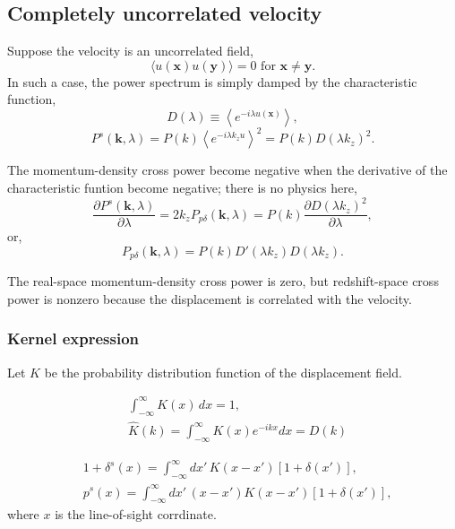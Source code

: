\documentclass[a4paper,11pt, fleqn]{article}
\begin{document}
\subsection{Completely uncorrelated velocity}

Suppose the velocity is an uncorrelated field,
\begin{equation}
  \langle u(\bm{x}) u(\bm{y}) \rangle = 0 \mbox{ for $\bm{x} \neq \bm{y}$}.
\end{equation}
In such a case, the power spectrum is simply damped by the
characteristic function,
%
\begin{equation}
  D(\lambda) \equiv \left\langle e^{-i\lambda u(\bm{x})}\right\rangle,
\end{equation}
%
\begin{equation}
  P^s(\bm{k}, \lambda) = P(k) \left\langle e^{-i\lambda k_z u} \right\rangle^2
  = P(k) D(\lambda k_z)^2.
\end{equation}

The momentum-density cross power become negative when the derivative
of the characteristic funtion become negative; there is no physics
here,
\begin{equation}
  \frac{\partial P^s(\bm{k}, \lambda)}{\partial \lambda}
  = 2k_z P_{p\delta}(\bm{k}, \lambda)
  = P(k) \frac{\partial D(\lambda k_z)^2}{\partial \lambda},
\end{equation}
or,
\begin{equation}
  P_{p\delta}(\bm{k}, \lambda) = P(k) D'(\lambda k_z) D(\lambda k_z).
\end{equation}

The real-space momentum-density cross power is zero, but
redshift-space cross power is nonzero because the displacement is
correlated with the velocity.

\subsubsection{Kernel expression}

Let $K$ be the probability distribution function of the displacement
field.

\begin{align}
  &\int_{-\infty}^\infty \! K(x) \, dx = 1,\\
  &\hat{K}(k) = \int_{-\infty}^\infty \! K(x) e^{-ik x} dx = D(k)
\end{align}

\begin{align}
  &1 + \delta^s(x) = \int_{-\infty}^\infty \! dx' \, K(x - x') [1 + \delta(x')],\\
  &p^s(x) = \int_{-\infty}^\infty \! dx' \, (x - x') K(x - x') [ 1 + \delta(x') ],
\end{align}
where $x$ is the line-of-sight corrdinate.\\
\end{document}
